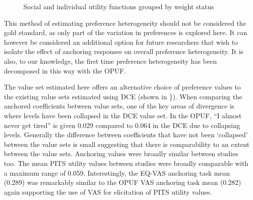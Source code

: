 \documentclass[
  number,
  preprint]{elsarticle}
\begin{document}
\begin{figure}


\caption{\label{fig-weight}Social and individual utility functions
grouped by weight status}

\end{figure}%

This method of estimating preference heterogeneity should not be
considered the gold standard, as only part of the variation in
preferences is explored here. It can however be considered an additional
option for future researchers that wish to isolate the effect of
anchoring responses on overall preference heterogeneity. It is also, to
our knowledge, the first time preference heterogeneity has been
decomposed in this way with the OPUF.

The value set estimated here offers an alternative choice of preference
values to the existing value sets estimated using DCE (shown in
\citep{tab-WAItEvalsets}\}). When comparing the anchored coefficients
between value sets, one of the key areas of divergence is where levels
have been collapsed in the DCE value set. In the OPUF, ``I almost never
get tired'' is given 0.029 compared to 0.064 in the DCE due to
collapsing levels. Generally the difference between coefficients that
have not been `collapsed' between the value sets is small suggesting
that there is comparability to an extent between the value sets.
Anchoring values were broadly similar between studies too. The mean PITS
utility values between studies were broadly comparable with a maximum
range of 0.059. Interestingly, the EQ-VAS anchoring task mean (0.289)
was remarkably similar to the OPUF VAS anchoring task mean (0.282) again
supporting the use of VAS for elicitation of PITS utility values.
\end{document}
